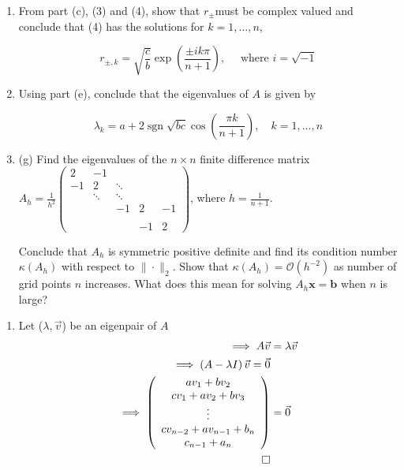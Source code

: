 \documentclass{report}
\begin{document}
{\begin{enumerate}[label=(\alph*)]
\item From part (c), (3) and (4), show that $r_{ \pm}$must be complex valued and conclude that (4) has the solutions for $k=1, \ldots, n$,

$$
r_{ \pm, k}=\sqrt{\frac{c}{b}} \exp \left(\frac{ \pm i k \pi}{n+1}\right), \quad \text { where } i=\sqrt{-1}
$$

\item Using part (e), conclude that the eigenvalues of $A$ is given by

$$
\lambda_k=a+2 \operatorname{sgn}\sqrt{b c} \cos \left(\frac{\pi k}{n+1}\right), \quad k=1, \ldots, n
$$
\item 
	(g) Find the eigenvalues of the $n \times n$ finite difference matrix $A_h=\frac{1}{h^2}\left(\begin{array}{ccccc}2 & -1 & && \\ -1 & 2 & \ddots&&  \\ & \ddots & \ddots \\ &&-1&2&-1 \\   &&\\ &&&-1&2 \end{array}\right)$, where $h=\frac{1}{n+1}$.

Conclude that $A_h$ is symmetric positive definite and find its condition number $\kappa\left(A_h\right)$ with respect to $\|\cdot\|_2$. Show that $\kappa\left(A_h\right)=\mathcal{O}\left(h^{-2}\right)$ as number of grid points $n$ increases. What does this mean for solving $A_h \boldsymbol{x}=\boldsymbol{b}$ when $n$ is large?

\end{enumerate}
}
\begin{solution}
	\begin{enumerate}[label=(\alph*)]
		\item Let ($\lambda, \vec{v}$) be an eigenpair of $A$ 
		\begin{align*}
				\implies A\vec{v} &=   \lambda \vec{v}\\
				\implies \left( A - \lambda I \right)\vec{v} = \vec{0} 	\\	
				 \implies \left(\begin{array}{ccccc}
av_1 + bv_2 \\
cv_1 + av_2 + bv_3 \\
 \vdots \\ 
  cv_{n-2} + av_{n-1}+ b_{n} \\
 c_{n-1} + a_n
\end{array}   \right) &= \vec{0} \\
\qed
		\end{align*}	
		
	\end{enumerate}
\end{solution}
\end{document}
